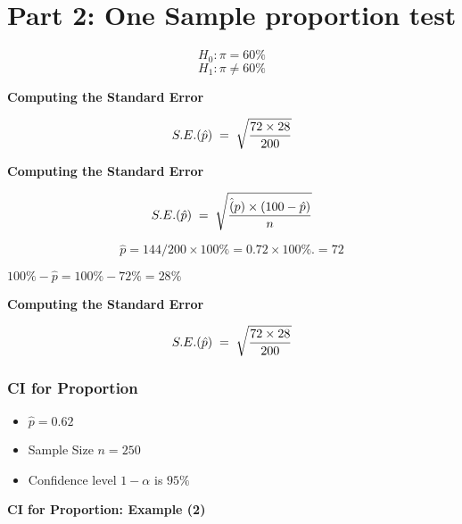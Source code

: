 \documentclass[]{report}
\begin{document}


\section{Part 2: One Sample proportion test}
\[ H_0: \pi = 60\%\]
\[ H_1: \pi \neq 60\%\]














{
\textbf{Computing the Standard Error}

\[
S.E. (\hat{p}) \;=\; \sqrt{ {72 \times 28 \over 200 }}
\]


}

{

\textbf{Computing the Standard Error}

\[
S.E. (\hat{p}) \;=\; \sqrt{ {\hat(p) \times (100 -\hat{p} )\over n}}
\]



\[
\hat{p} = {144/200}  \times 100\%  = 0.72 \times 100\%.  = 72%
\]

$100\% - \hat{p} = 100\% - 72\% = 28\% $


\textbf{Computing the Standard Error}

\[
S.E. (\hat{p}) \;=\; \sqrt{ {72 \times 28 \over 200 }}
\]


}




\subsubsection{CI for Proportion}

\begin{itemize}
\item $\hat{p}  = 0.62$
\item Sample Size $n=250$
\item Confidence level $1-\alpha$ is $95\%$
\end{itemize}





\textbf{CI for Proportion: Example (2)}
\end{document}
